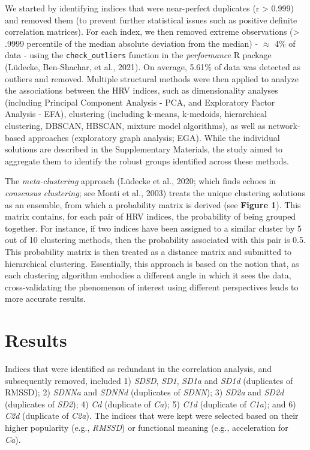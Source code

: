 \documentclass[
  english,
  jou,floatsintext]{apa6}
\begin{document}
We started by identifying indices that were near-perfect duplicates (\textbar r\textbar{} \textgreater{} 0.999) and removed them (to prevent further statistical issues such as positive definite correlation matrices). For each index, we then removed extreme observations (\textgreater{} .9999 percentile of the median absolute deviation from the median) - \(\approx\) 4\% of data - using the \texttt{check\_outliers} function in the \emph{performance} R package (Lüdecke, Ben-Shachar, et al., 2021). On average, 5.61\% of data was detected as outliers and removed. Multiple structural methods were then applied to analyze the associations between the HRV indices, such as dimensionality analyses (including Principal Component Analysis - PCA, and Exploratory Factor Analysis - EFA), clustering (including k-means, k-medoids, hierarchical clustering, DBSCAN, HBSCAN, mixture model algorithms), as well as network-based approaches (exploratory graph analysis; EGA). While the individual solutions are described in the Supplementary Materials, the study aimed to aggregate them to identify the robust groups identified across these methods.

The \emph{meta-clustering} approach (Lüdecke et al., 2020; which finds echoes in \emph{consensus clustering}; see Monti et al., 2003) treats the unique clustering solutions as an ensemble, from which a probability matrix is derived (see \textbf{Figure 1}). This matrix contains, for each pair of HRV indices, the probability of being grouped together. For instance, if two indices have been assigned to a similar cluster by 5 out of 10 clustering methods, then the probability associated with this pair is 0.5. This probability matrix is then treated as a distance matrix and submitted to hierarchical clustering. Essentially, this approach is based on the notion that, as each clustering algorithm embodies a different angle in which it sees the data, cross-validating the phenomenon of interest using different perspectives leads to more accurate results.

\hypertarget{results}{%
\section{Results}\label{results}}

Indices that were identified as redundant in the correlation analysis, and subsequently removed, included 1) \emph{SDSD}, \emph{SD1}, \emph{SD1a} and \emph{SD1d} (duplicates of RMSSD); 2) \emph{SDNNa} and \emph{SDNNd} (duplicates of \emph{SDNN}); 3) \emph{SD2a} and \emph{SD2d} (duplicates of \emph{SD2}); 4) \emph{Cd} (duplicate of \emph{Ca}); 5) \emph{C1d} (duplicate of \emph{C1a}); and 6) \emph{C2d} (duplicate of \emph{C2a}). The indices that were kept were selected based on their higher popularity (e.g., \emph{RMSSD}) or functional meaning (e.g., acceleration for \emph{Ca}).
\end{document}
